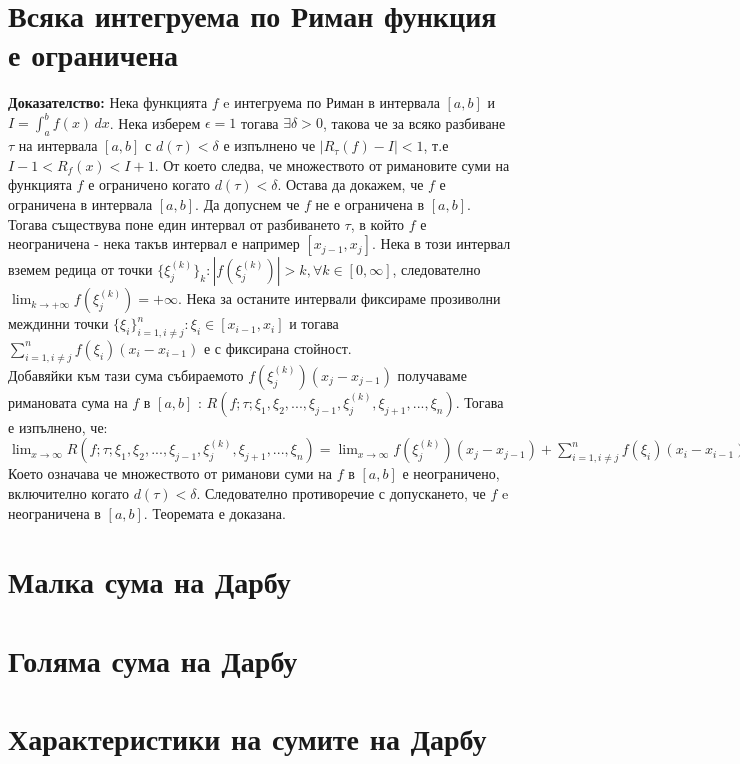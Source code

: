 \documentclass[fleqn,12pt]{article}
\begin{document}
\begin{flushleft}
\section{Всяка интегруема по Риман функция е ограничена}
\textbf{Доказателство: } Нека функцията $f$ e интегруема по Риман в интервала $[a,b]$ и $I = \int_{a}^{b}  f(x)\,dx$. Нека изберем $\epsilon=1$ тогава $\exists \delta>0$, такова че 
за всяко разбиване $\tau$ на интервала $[a,b]$ с $d(\tau)<\delta$ е изпълнено че $|R_\tau(f) - I|<1$, т.е $I-1<R_f(x)<I+1$. От което следва, че множеството от римановите суми на функцията
$f$ е ограничено когато $d(\tau)<\delta$. Остава да докажем, че $f$ е ограничена в интервала $[a,b]$.
Да допуснем че $f$ не е ограничена в $[a,b]$. Тогава съществува поне един интервал от разбиването $\tau$, в който $f$ е неограничена - нека такъв интервал е например $[x_{j-1},x_j]$.
Нека в този интервал вземем редица от точки $\{\xi_j^{(k)}\}_k : |f(\xi_j^{(k)})| > k, \forall k \in [0,\infty]$, следователно $\lim_{k \rightarrow +\infty} f(\xi_j^{(k)}) = +\infty$.
Нека за останите интервали фиксираме прозиволни междинни точки $\{\xi_i\}_{i=1,i \neq j}^n : \xi_i \in [x_{i-1},x_i]$ и тогава $\sum_{i=1,i \neq j}^{n} f(\xi_i)(x_i - x_{i-1})$ е с фиксирана стойност.\\
Добавяйки към тази сума събираемото $f(\xi_j^{(k)})(x_j - x_{j-1})$ получаваме римановата сума на $f$ в $[a,b]$ : $R(f;\tau;\xi_1,\xi_2, ... ,\xi_{j-1},\xi_j^{(k)},\xi_{j+1}, ... ,\xi_n)$.
Тогава е изпълнено, че: $\lim_{x \rightarrow \infty} R(f;\tau;\xi_1,\xi_2, ... ,\xi_{j-1},\xi_j^{(k)},\xi_{j+1}, ... ,\xi_n) = \lim_{x \rightarrow \infty} f(\xi_j^{(k)})(x_j - x_{j-1}) + \sum_{i=1,i \neq j}^{n} f(\xi_i)(x_i - x_{i-1}) = +\infty$ \\
Което означава че множеството от риманови суми на $f$ в $[a,b]$ е неограничено, включително когато $d(\tau)<\delta$. Следователно противоречие с допускането, че $f$ e неограничена в $[a,b]$.
Теоремата е доказана. 

\section{Малка сума на Дарбу}
\section{Голяма сума на Дарбу}
\section{Характеристики на сумите на Дарбу}

\end{flushleft}
\end{document}
